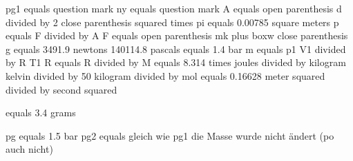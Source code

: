 pg1 equals question mark
ny equals question mark
A equals open parenthesis d divided by 2 close parenthesis squared times pi equals 0.00785 square meters
p equals F divided by A
F equals open parenthesis mk plus boxw close parenthesis g equals 3491.9 newtons
140114.8 pascals equals 1.4 bar
m equals p1 V1 divided by R T1
R equals R divided by M equals 8.314 times joules divided by kilogram kelvin divided by 50 kilogram divided by mol equals 0.16628 meter squared divided by second squared

equals 3.4 grams

pg equals 1.5 bar
pg2 equals gleich wie pg1
die Masse wurde nicht ändert (po auch nicht)